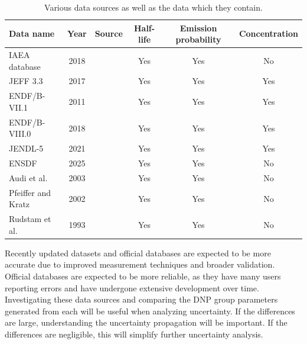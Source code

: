 \begin{table}[H]
    \centering
    \caption{Various data sources as well as the data which they contain.}
    \begin{tabular}{lccccc}
    \hline
    Data name & Year & Source & Half-life & Emission probability & Concentration\\
    \hline
      \gls{IAEA} database & 2018 & \cite{DIMITRIOU2021144} & Yes & Yes & No\\
      \gls{JEFF} 3.3 & 2017 & \cite{plompen2020joint} & Yes & Yes & Yes\\
      \gls{ENDF}/B-VII.1 & 2011 & \cite{chadwick2011endf} & Yes & Yes & Yes\\
      \gls{ENDF}/B-VIII.0 & 2018 & \cite{Brown20181} & Yes & Yes & Yes\\
      \gls{JENDL}-5 & 2021 & \cite{iwamoto2023japanese} & Yes & Yes & Yes\\
      \gls{ENSDF} & 2025 & \cite{ensdf} & Yes & Yes & No\\
      Audi et al. & 2003 & \cite{audi2003nubase} & Yes & Yes & No\\
      Pfeiffer and Kratz & 2002 & \cite{pfeiffer2002status} & Yes & Yes & No\\
      Rudstam et al. & 1993& \cite{rudstam1993delayed} & Yes & Yes & No\\
    \hline
    \end{tabular}
    \label{tab:datasources}
\end{table}

Recently updated datasets and official databases are expected to be more accurate due to improved measurement techniques and broader validation.
Official databases are expected to be more reliable, as they have many users reporting errors and have undergone extensive development over time.
Investigating these data sources and comparing the \gls{DNP} group parameters generated from each will be useful when analyzing uncertainty.
If the differences are large, understanding the uncertainty propagation will be important.
If the differences are negligible, this will simplify further uncertainty analysis.

